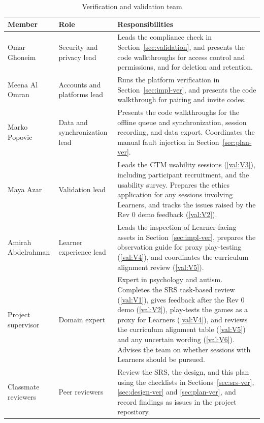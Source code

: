 \documentclass[12pt, titlepage]{article}
\newcounter{validation}
\newcommand{\valref}[1]{\hyperref[val:V#1]{\ref*{val:V#1}}}
\begin{document}
\begin{table}[htbp]
\centering\small
\caption{Verification and validation team}
\label{tab:vv-team}
\renewcommand{\arraystretch}{1.2}
\begin{tabularx}{\textwidth}{>{\raggedright\arraybackslash}p{} >{\raggedright\arraybackslash}p{} >{\raggedright\arraybackslash}X}
\toprule
\textbf{Member} & \textbf{Role} & \textbf{Responsibilities}\\
\midrule
Omar Ghoneim & Security and privacy lead & Leads the compliance check in Section~\ref{sec:validation}, and presents the code walkthroughs for access control and permissions, and for deletion and retention.\\
Meena Al Omran & Accounts and platforms lead & Runs the platform verification in Section~\ref{sec:impl-ver}, and presents the code walkthrough for pairing and invite codes.\\
Marko Popovic & Data and synchronization lead & Presents the code walkthroughs for the offline queue and synchronization, session recording, and data export. Coordinates the manual fault injection in Section~\ref{sec:plan-ver}.\\
Maya Azar & Validation lead & Leads the CTM usability sessions (\valref{3}), including participant recruitment, and the usability survey. Prepares the ethics application for any sessions involving Learners, and tracks the issues raised by the Rev 0 demo feedback (\valref{2}).\\
Amirah Abdelrahman & Learner experience lead & Leads the inspection of Learner-facing assets in Section~\ref{sec:impl-ver}, prepares the observation guide for proxy play-testing (\valref{4}), and coordinates the curriculum alignment review (\valref{5}).\\
\midrule
Project supervisor & Domain expert & Expert in psychology and autism. Completes the SRS task-based review (\valref{1}), gives feedback after the Rev 0 demo (\valref{2}), play-tests the games as a proxy for Learners (\valref{4}), and reviews the curriculum alignment table (\valref{5}) and any uncertain wording (\valref{6}). Advises the team on whether sessions with Learners should be pursued.\\
Classmate reviewers & Peer reviewers & Review the SRS, the design, and this plan using the checklists in Sections~\ref{sec:srs-ver}, \ref{sec:design-ver} and \ref{sec:plan-ver}, and record findings as issues in the project repository.\\
\bottomrule
\end{tabularx}
\end{table}
\end{document}
